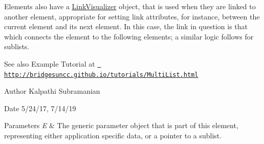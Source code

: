 Elements also have a \mbox{\hyperlink{classbridges_1_1base_1_1_link_visualizer}{Link\+Visualizer}} object, that is used when they are linked to another element, appropriate for setting link attributes, for instance, between the current element and its next element. In this case, the link in question is that which connects the element to the following elements; a similar logic follows for sublists.

\begin{DoxySeeAlso}{See also}
Example Tutorial at \href{http://bridgesuncc.github.io/tutorials/MultiList.html}{\texttt{ http\+://bridgesuncc.\+github.\+io/tutorials/\+Multi\+List.\+html}}
\end{DoxySeeAlso}
\begin{DoxyAuthor}{Author}
Kalpathi Subramanian
\end{DoxyAuthor}
\begin{DoxyDate}{Date}
5/24/17, 7/14/19
\end{DoxyDate}

\begin{DoxyParams}{Parameters}
{\em E} & The generic parameter object that is part of this element, representing either application specific data, or a pointer to a sublist. \\
\hline
\end{DoxyParams}
